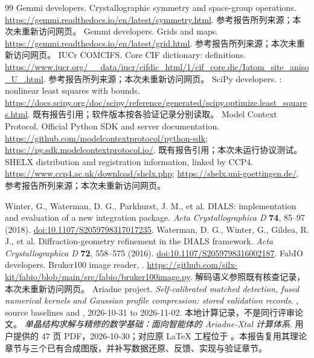 \begin{thebibliography}{99}
 Gemmi developers. Crystallographic symmetry and space-group operations. \url{https://gemmi.readthedocs.io/en/latest/symmetry.html}. 参考报告所列来源；本次未重新访问网页。
 Gemmi developers. Grids and maps. \url{https://gemmi.readthedocs.io/en/latest/grid.html}. 参考报告所列来源；本次未重新访问网页。
 IUCr COMCIFS. Core CIF dictionary:  definitions. \url{https://www.iucr.org/__data/iucr/cifdic_html/1/cif_core.dic/Iatom_site_aniso_U_.html}. 参考报告所列来源；本次未重新访问网页。
 SciPy developers. : nonlinear least squares with bounds. \url{https://docs.scipy.org/doc/scipy/reference/generated/scipy.optimize.least_squares.html}. 既有报告引用；软件版本按各验证记录分别读取。
 Model Context Protocol. Official Python SDK and server documentation. \url{https://github.com/modelcontextprotocol/python-sdk}; \url{https://py.sdk.modelcontextprotocol.io/}. 既有报告引用；本次未运行协议测试。
 SHELX distribution and registration information, linked by CCP4. \url{https://www.ccp4.ac.uk/download/shelx.php}; \url{https://shelx.uni-goettingen.de/}. 参考报告所列来源；本次未重新访问网页。

 Winter, G., Waterman, D. G., Parkhurst, J. M., et al. DIALS: implementation and evaluation of a new integration package. \textit{Acta Crystallographica D} \textbf{74}, 85--97 (2018). \href{https://doi.org/10.1107/S2059798317017235}{doi:10.1107/S2059798317017235}.
 Waterman, D. G., Winter, G., Gildea, R. J., et al. Diffraction-geometry refinement in the DIALS framework. \textit{Acta Crystallographica D} \textbf{72}, 558--575 (2016). \href{https://doi.org/10.1107/S2059798316002187}{doi:10.1107/S2059798316002187}.
 FabIO developers. Bruker100 image reader, . \url{https://github.com/silx-kit/fabio/blob/main/src/fabio/bruker100image.py}. 解码语义参照既有核查记录，本次未重新访问网页。
 Ariadne project. \textit{Self-calibrated matched detection, fused numerical kernels and Gaussian profile compression: stored validation records}. , source baselines  and , 2026-10-31 to 2026-11-02. 本地计算记录，不是同行评审论文。
 \textit{单晶结构求解与精修的数学基础：面向智能体的 Ariadne-Xtal 计算体系}. 用户提供的 47 页 PDF，2026-10-30；对应原 LaTeX 工程位于 。本报告复用其理论章节与三个已有合成图版，并补写数据还原、反馈、实现与验证章节。

\end{thebibliography}
